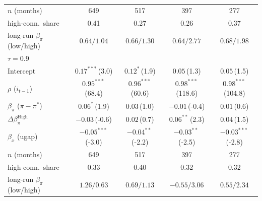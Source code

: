 \begin{tabular}{lcccc}
\addlinespace
$n$ (months) & 649 & 517 & 397 & 277 \\
high-conn.\ share & 0.41 & 0.27 & 0.26 & 0.37 \\
long-run $\beta_\pi$ (low/high) & $0.64/1.04$ & $0.66/1.30$ & $0.64/2.77$ & $0.68/1.98$ \\
\midrule
\multicolumn{5}{l}{\textit{$\tau=0.9$}} \\
Intercept & $0.17^{***}$\,{\scriptsize(3.0)} & $0.12^{*}$\,{\scriptsize(1.9)} & $0.05$\,{\scriptsize(1.3)} & $0.05$\,{\scriptsize(1.5)} \\
$\rho$ ($i_{t-1}$) & $0.95^{***}$\,{\scriptsize(68.4)} & $0.96^{***}$\,{\scriptsize(60.6)} & $0.98^{***}$\,{\scriptsize(118.6)} & $0.98^{***}$\,{\scriptsize(104.8)} \\
$\beta_\pi$ ($\pi-\pi^*$) & $0.06^{*}$\,{\scriptsize(1.9)} & $0.03$\,{\scriptsize(1.0)} & $-0.01$\,{\scriptsize(-0.4)} & $0.01$\,{\scriptsize(0.6)} \\
$\Delta\beta_\pi^{\text{High}}$ & $-0.03$\,{\scriptsize(-0.6)} & $0.02$\,{\scriptsize(0.7)} & $0.06^{**}$\,{\scriptsize(2.3)} & $0.04$\,{\scriptsize(1.5)} \\
$\beta_x$ (ugap) & $-0.05^{***}$\,{\scriptsize(-3.0)} & $-0.04^{**}$\,{\scriptsize(-2.2)} & $-0.03^{**}$\,{\scriptsize(-2.5)} & $-0.03^{***}$\,{\scriptsize(-2.8)} \\
\addlinespace
$n$ (months) & 649 & 517 & 397 & 277 \\
high-conn.\ share & 0.33 & 0.40 & 0.32 & 0.32 \\
long-run $\beta_\pi$ (low/high) & $1.26/0.63$ & $0.69/1.13$ & $-0.55/3.06$ & $0.55/2.34$ \\
\bottomrule
\end{tabular}
